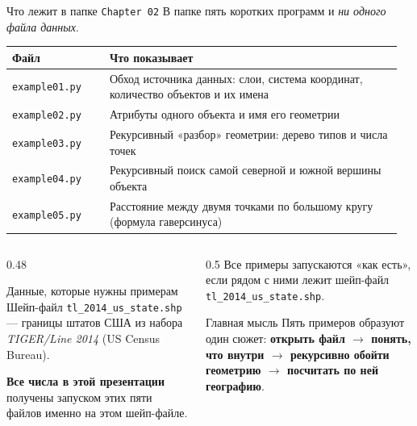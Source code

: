\documentclass[aspectratio=169,10pt]{beamer}
\begin{document}
\begin{frame}[fragile]{Что лежит в папке \texttt{Chapter 02}}
\footnotesize
В папке пять коротких программ и \emph{ни одного файла данных}.

\vspace{0.2em}
\begin{tabular}{@{}p{0.24\linewidth}p{0.72\linewidth}@{}}
  \toprule
  Файл & Что показывает \\
  \midrule
  \texttt{example01.py} & Обход источника данных: слои, система координат,
    количество объектов и их имена \\
  \texttt{example02.py} & Атрибуты одного объекта и имя его геометрии \\
  \texttt{example03.py} & Рекурсивный «разбор» геометрии: дерево типов
    и числа точек \\
  \texttt{example04.py} & Рекурсивный поиск самой северной и южной
    вершины объекта \\
  \texttt{example05.py} & Расстояние между двумя точками по большому кругу
    (формула гаверсинуса) \\
  \bottomrule
\end{tabular}

\vspace{0.6em}
\begin{columns}[T,onlytextwidth]
  \begin{column}{0.48\textwidth}
    \begin{block}{Данные, которые нужны примерам}\small
      Шейп-файл \texttt{tl\_2014\_us\_state.shp} --- границы штатов США
      из набора \emph{TIGER/Line 2014} (US Census Bureau).
      \medskip

      \textbf{Все числа в этой презентации} получены запуском этих пяти
      файлов именно на этом шейп-файле.
    \end{block}
  \end{column}
  \begin{column}{0.5\textwidth}
    {\scriptsize Все примеры запускаются «как есть», если рядом с ними
     лежит шейп-файл \texttt{tl\_2014\_us\_state.shp}.}

    \vspace{0.3em}
    \begin{alertblock}{Главная мысль}\small
      Пять примеров образуют один сюжет: \textbf{открыть файл $\to$
      понять, что внутри $\to$ рекурсивно обойти геометрию $\to$
      посчитать по ней географию}.
    \end{alertblock}
  \end{column}
\end{columns}
\end{frame}
\end{document}
